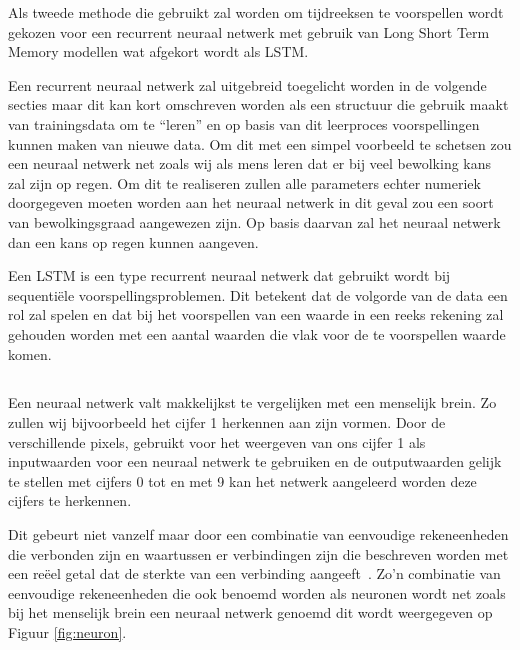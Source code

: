 Als tweede methode die gebruikt zal worden om tijdreeksen te voorspellen wordt gekozen voor een recurrent neuraal netwerk met gebruik van Long Short Term Memory modellen wat afgekort wordt als LSTM. 

Een recurrent neuraal netwerk zal uitgebreid toegelicht worden in de volgende secties maar dit kan kort omschreven worden als een structuur die gebruik maakt van trainingsdata om te ``leren'' en op basis van dit leerproces voorspellingen kunnen maken van nieuwe data. Om dit met een simpel voorbeeld te schetsen zou een neuraal netwerk net zoals wij als mens leren dat er bij veel bewolking kans zal zijn op regen. Om dit te realiseren zullen alle parameters echter numeriek doorgegeven moeten worden aan het neuraal netwerk in dit geval zou een soort van bewolkingsgraad aangewezen zijn. Op basis daarvan zal het neuraal netwerk dan een kans op regen kunnen aangeven. 

Een LSTM is een type recurrent neuraal netwerk dat gebruikt wordt bij sequenti\"{e}le voorspellingsproblemen. Dit betekent dat de volgorde van de data een rol zal spelen en dat bij het voorspellen van een waarde in een reeks rekening zal gehouden worden met een aantal waarden die vlak voor de te voorspellen waarde komen. 


\subsection{}
\label{subsec: Theretische toelichting van long short term memory netwerken (LSTM)}

Een neuraal netwerk valt makkelijkst te vergelijken met een menselijk brein. Zo zullen wij bijvoorbeeld het cijfer 1 herkennen aan zijn vormen. Door de verschillende pixels, gebruikt voor het weergeven van ons cijfer 1 als inputwaarden voor een neuraal netwerk te gebruiken en de outputwaarden gelijk te stellen met cijfers 0 tot en met 9 kan het netwerk aangeleerd worden deze cijfers te herkennen. 

Dit gebeurt niet vanzelf maar door een combinatie van eenvoudige rekeneenheden die verbonden zijn en waartussen er verbindingen zijn die beschreven worden met een re\"{e}el getal dat de sterkte van een verbinding aangeeft~\autocite{Lievens2018a}. Zo'n combinatie van eenvoudige rekeneenheden die ook benoemd worden als neuronen wordt net zoals bij het menselijk brein een neuraal netwerk genoemd dit wordt weergegeven op Figuur \ref{fig:neuron}. 

